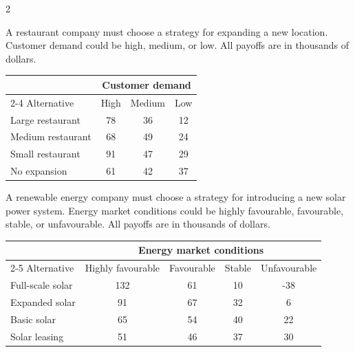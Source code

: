 \begin{multicols}{2}
		\columnbreak
		
		A restaurant company must choose a strategy for expanding a new location. Customer demand could be high, medium, or low. All payoffs are in thousands of dollars.
		
		\begin{center}
			\renewcommand{\arraystretch}{1.3}
			\small
			\begin{tabular}{lccc}
				\toprule
				& \multicolumn{3}{c}{Customer demand} \\
				\cmidrule(lr){2-4}
				Alternative & High & Medium & Low \\
				\midrule
				Large restaurant & 78 & 36 & 12 \\
				Medium restaurant & 68 & 49 & 24 \\
				Small restaurant & 91 & 47 & 29 \\
				No expansion & 61 & 42 & 37 \\
				\bottomrule
			\end{tabular}
		\end{center}
		\vspace{-5mm}
		
		
		
	\end{multicols}
	
	A renewable energy company must choose a strategy for introducing a new solar power system. Energy market conditions could be highly favourable, favourable, stable, or unfavourable. All payoffs are in thousands of dollars.
	
	\begin{center}
		\renewcommand{\arraystretch}{1.3}
		\small
		\begin{tabular}{lcccc}
			\toprule
			& \multicolumn{4}{c}{Energy market conditions} \\
			\cmidrule(lr){2-5}
			Alternative & Highly favourable & Favourable & Stable & Unfavourable \\
			\midrule
			Full-scale solar & 132 & 61 & 10 & -38 \\
			Expanded solar & 91 & 67 & 32 & 6 \\
			Basic solar & 65 & 54 & 40 & 22 \\
			Solar leasing & 51 & 46 & 37 & 30 \\
			\bottomrule
		\end{tabular}
	\end{center}
	\vspace{-5mm}

	


